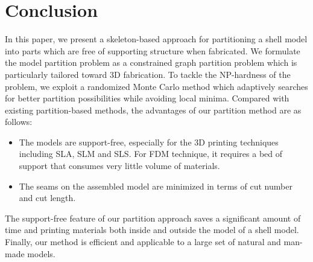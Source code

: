 \section{Conclusion}

In this paper, we present a skeleton-based approach for partitioning a shell model into parts which are free of supporting structure when fabricated. We formulate the model partition problem as a constrained graph partition problem which is particularly tailored toward 3{D} fabrication. To tackle the NP-hardness of the problem, we exploit a randomized Monte Carlo method which adaptively searches for better partition possibilities while avoiding local minima. Compared with existing partition-based methods, the advantages of our partition method are as follows:

\begin{itemize}
 \item The models are support-free, especially for the 3D printing techniques including SLA, SLM and SLS. For FDM technique, it requires a bed of support that consumes very little volume of materials.
\item The seams on the assembled model are minimized in terms of cut number and cut length.
\end{itemize}

The support-free feature of our partition approach saves a significant amount of time and printing materials both inside and outside the model of a shell model. Finally, our method is efficient and applicable to a large set of natural and man-made models.
